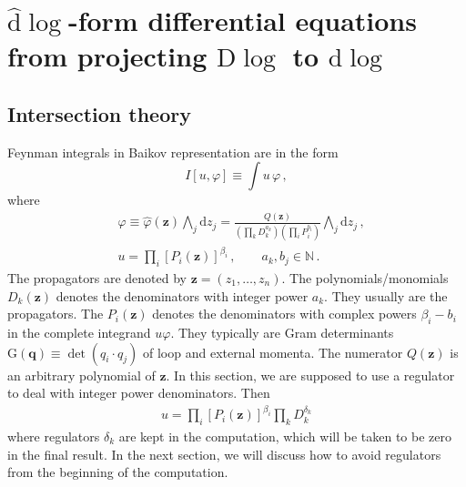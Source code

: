 \documentclass[a4paper,11pt]{article}
\newcommand{\nn}{\nonumber}
\newcommand{\nd}{\mathrm{d}}
\newcommand{\nds}{\hat{\mathrm{d}}}
\newcommand{\nG}{\mathrm{G}}
\begin{document}
\section{$\nds \log$-form differential equations from projecting $\mathrm{D} \log$ to $\nd \log$ } \label{sec:dlog}

\subsection{Intersection theory} \label{sec:intnum}
Feynman integrals in Baikov representation are  in the form 
\begin{equation}
	I[u,\varphi] \equiv \int  u \, \varphi \,, %
\end{equation}
where
\begin{align}
&\varphi \equiv \hat{\varphi}(\bm{z}) \bigwedge_j \nd z_j =\frac{Q(\bm{z})}{\left(\prod_k D_k^{a_k} \right) \left(\prod_i P_i^{b_i} \right)} \bigwedge_j \nd z_j \, , \nn\\
    &u=\prod_i \left[P_i(\bm{z})\right]^{\beta_i} \,,
    \quad \quad  a_k, b_j\in \mathbb{N}  \, .
    \label{eq:baikov}
\end{align}
The propagators are denoted by $\bm{z}=(z_1,\ldots,z_n)$. 
The polynomials/monomials $D_k(\bm{z})$ denotes the denominators with integer power $a_k$. They usually are the propagators. The $P_i(\bm{z})$ denotes the denominators with complex powers $\beta_i-b_i$ in the complete integrand $u\varphi$. They typically are Gram determinants $\nG(\bm{q})\equiv\det(q_i \cdot q_j)$ of loop and external momenta. The numerator $Q(\bm{z})$ is an arbitrary polynomial of $\bm{z}$. In this section, we are supposed to use a regulator to deal with integer power denominators. Then 
\begin{align}
u=\prod_i \left[P_i(\bm{z})\right]^{\beta_i} \prod_k D_k^{\delta_k}
\end{align}
where  regulators $\delta_k$ are kept in the computation, which will be  taken to be zero in the final result. In the next section, we will discuss how to avoid regulators from the beginning of the computation.
\end{document}
